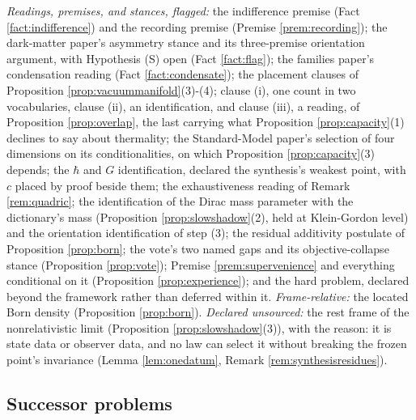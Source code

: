 \documentclass[11pt]{article}
\theoremstyle{definition}
\begin{document}
\emph{Readings, premises, and stances, flagged:} the indifference premise (Fact \ref{fact:indifference}) and the recording premise (Premise \ref{prem:recording}); the dark-matter paper's asymmetry stance and its three-premise orientation argument, with Hypothesis (S) open (Fact \ref{fact:flag}); the families paper's condensation reading (Fact \ref{fact:condensate}); the placement clauses of Proposition \ref{prop:vacuummanifold}(3)-(4); clause (i), one count in two vocabularies, clause (ii), an identification, and clause (iii), a reading, of Proposition \ref{prop:overlap}, the last carrying what Proposition \ref{prop:capacity}(1) declines to say about thermality; the Standard-Model paper's selection of four dimensions on its conditionalities, on which Proposition \ref{prop:capacity}(3) depends; the $\hbar$ and $G$ identification, declared the synthesis's weakest point, with $c$ placed by proof beside them; the exhaustiveness reading of Remark \ref{rem:quadric}; the identification of the Dirac mass parameter with the dictionary's mass (Proposition \ref{prop:slowshadow}(2), held at Klein-Gordon level) and the orientation identification of step (3); the residual additivity postulate of Proposition \ref{prop:born}; the vote's two named gaps and its objective-collapse stance (Proposition \ref{prop:vote}); Premise \ref{prem:supervenience} and everything conditional on it (Proposition \ref{prop:experience}); and the hard problem, declared beyond the framework rather than deferred within it. \emph{Frame-relative:} the located Born density (Proposition \ref{prop:born}). \emph{Declared unsourced:} the rest frame of the nonrelativistic limit (Proposition \ref{prop:slowshadow}(3)), with the reason: it is state data or observer data, and no law can select it without breaking the frozen point's invariance (Lemma \ref{lem:onedatum}, Remark \ref{rem:synthesisresidues}).

\subsection*{Successor problems}
\end{document}
